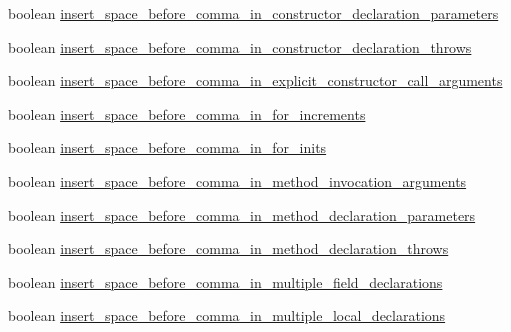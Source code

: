 \begin{DoxyCompactItemize}
\item 
boolean \hyperlink{classorg_1_1eclipse_1_1jdt_1_1ui_1_1tests_1_1refactoring_1_1infra_1_1TestFormatterOptions_a4e2eafb1efaf64149ba2d7cc4a52af54}{insert\_\-space\_\-before\_\-comma\_\-in\_\-constructor\_\-declaration\_\-parameters}
\item 
boolean \hyperlink{classorg_1_1eclipse_1_1jdt_1_1ui_1_1tests_1_1refactoring_1_1infra_1_1TestFormatterOptions_a6f56920c21809c2d553f83e9ae473f44}{insert\_\-space\_\-before\_\-comma\_\-in\_\-constructor\_\-declaration\_\-throws}
\item 
boolean \hyperlink{classorg_1_1eclipse_1_1jdt_1_1ui_1_1tests_1_1refactoring_1_1infra_1_1TestFormatterOptions_ae982cbcfbebb7165f9a10aafa175ad0f}{insert\_\-space\_\-before\_\-comma\_\-in\_\-explicit\_\-constructor\_\-call\_\-arguments}
\item 
boolean \hyperlink{classorg_1_1eclipse_1_1jdt_1_1ui_1_1tests_1_1refactoring_1_1infra_1_1TestFormatterOptions_a232451caa43786f5fcc9daac9cd3a2ff}{insert\_\-space\_\-before\_\-comma\_\-in\_\-for\_\-increments}
\item 
boolean \hyperlink{classorg_1_1eclipse_1_1jdt_1_1ui_1_1tests_1_1refactoring_1_1infra_1_1TestFormatterOptions_a56be7a1d740b554098689429b7bbd221}{insert\_\-space\_\-before\_\-comma\_\-in\_\-for\_\-inits}
\item 
boolean \hyperlink{classorg_1_1eclipse_1_1jdt_1_1ui_1_1tests_1_1refactoring_1_1infra_1_1TestFormatterOptions_a36fe7c104f76c4c8f4bace1faed5872b}{insert\_\-space\_\-before\_\-comma\_\-in\_\-method\_\-invocation\_\-arguments}
\item 
boolean \hyperlink{classorg_1_1eclipse_1_1jdt_1_1ui_1_1tests_1_1refactoring_1_1infra_1_1TestFormatterOptions_a781ceea4fb930f82c141fe26e873ed1d}{insert\_\-space\_\-before\_\-comma\_\-in\_\-method\_\-declaration\_\-parameters}
\item 
boolean \hyperlink{classorg_1_1eclipse_1_1jdt_1_1ui_1_1tests_1_1refactoring_1_1infra_1_1TestFormatterOptions_a885bf47f55975eff8beb2372cce8636b}{insert\_\-space\_\-before\_\-comma\_\-in\_\-method\_\-declaration\_\-throws}
\item 
boolean \hyperlink{classorg_1_1eclipse_1_1jdt_1_1ui_1_1tests_1_1refactoring_1_1infra_1_1TestFormatterOptions_abda096e046492abe4b92eb0ace37a01f}{insert\_\-space\_\-before\_\-comma\_\-in\_\-multiple\_\-field\_\-declarations}
\item 
boolean \hyperlink{classorg_1_1eclipse_1_1jdt_1_1ui_1_1tests_1_1refactoring_1_1infra_1_1TestFormatterOptions_a966dbabcffe9c21a110295fa6de78010}{insert\_\-space\_\-before\_\-comma\_\-in\_\-multiple\_\-local\_\-declarations}

\end{DoxyCompactItemize}
